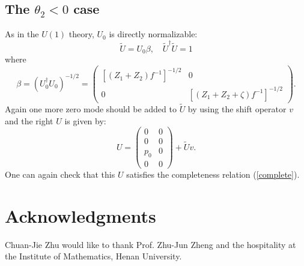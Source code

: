 \documentclass[a4paper,a4paper]{article}
\begin{document}
\subsection{The $\theta_2<0$ case}

As in the $U(1)$ theory, $U_0$ is directly normalizable:
\begin{equation}
\tilde{U}=U_0\beta,\quad\tilde{U}^\dag\tilde{U}=1
\end{equation}
where
\begin{equation}
\beta=(U_0^\dag U_0)^{-1/2}=\left(\begin{array}{cc}
[(Z_1+Z_2)f^{-1}]^{-1/2} & 0 \\ 0 & [(Z_1+Z_2+\zeta)
f^{-1}]^{-1/2} \end{array}\right).
\end{equation}
Again one more zero mode should be added to $\tilde{U}$ by using
the shift operator $v$ and the right $U$ is given by:
\begin{equation}
U=\left(\begin{array}{cc} 0 & 0 \\ 0 & 0 \\ p_0 & 0 \\ 0
& 0 \end{array}\right)+\tilde{U}v.
\end{equation}
One can again check that this $U$ satisfies the completeness
relation (\ref{complete}).

\section*{Acknowledgments}

Chuan-Jie Zhu would like to thank Prof. Zhu-Jun Zheng and the
hospitality at the Institute of Mathematics, Henan University.
\end{document}
